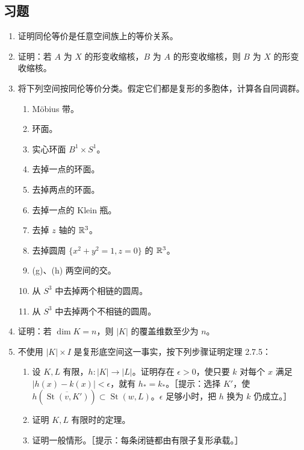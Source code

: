 \subsection*{习题}
\begin{enumerate}
\item 证明同伦等价是任意空间族上的等价关系。
\item 证明：若 $A$ 为 $X$ 的形变收缩核，$B$ 为 $A$ 的形变收缩核，则 $B$ 为 $X$ 的形变收缩核。
\item 将下列空间按同伦等价分类。假定它们都是复形的多胞体，计算各自同调群。
\begin{enumerate}[label=(\alph*)]
\item Möbius 带。
\item 环面。
\item 实心环面 $B^1\times S^1$。
\item 去掉一点的环面。
\item 去掉两点的环面。
\item 去掉一点的 Klein 瓶。
\item 去掉 $z$ 轴的 $\mathbb{R}^3$。
\item 去掉圆周 $\{x^2+y^2=1,z=0\}$ 的 $\mathbb{R}^3$。
\item (g)、(h) 两空间的交。
\item 从 $S^3$ 中去掉两个相链的圆周。
\item 从 $S^3$ 中去掉两个不相链的圆周。
\end{enumerate}
\item 证明：若 $\dim K=n$，则 $|K|$ 的覆盖维数至少为 $n$。
\item 不使用 $|K|\times I$ 是复形底空间这一事实，按下列步骤证明定理 2.7.5：
\begin{enumerate}[label=(\alph*)]
\item 设 $K,L$ 有限，$h:|K|\to|L|$。证明存在 $\epsilon>0$，使只要 $k$ 对每个 $x$ 满足 $|h(x)-k(x)|<\epsilon$，就有 $h_*=k_*$。［提示：选择 $K'$，使 $h(\overline{\operatorname{St}(v,K')})\subset\operatorname{St}(w,L)$。$\epsilon$ 足够小时，把 $h$ 换为 $k$ 仍成立。］
\item 证明 $K,L$ 有限时的定理。
\item 证明一般情形。［提示：每条闭链都由有限子复形承载。］
\end{enumerate}
\end{enumerate}
